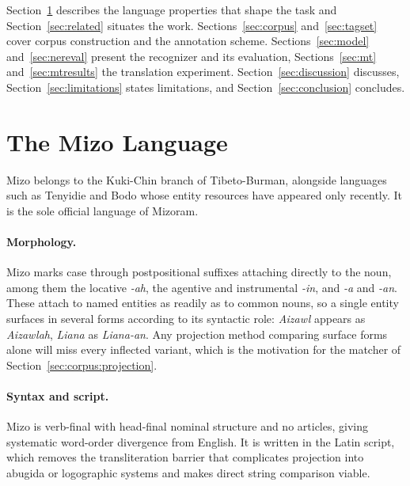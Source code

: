 \documentclass[acmsmall,screen,review]{acmart}
\begin{document}
Section~\ref{sec:mizo} describes the language properties that shape the task and
Section~\ref{sec:related} situates the work. Sections~\ref{sec:corpus}
and~\ref{sec:tagset} cover corpus construction and the annotation scheme.
Sections~\ref{sec:model} and~\ref{sec:nereval} present the recognizer and its
evaluation, Sections~\ref{sec:mt} and~\ref{sec:mtresults} the translation
experiment. Section~\ref{sec:discussion} discusses,
Section~\ref{sec:limitations} states limitations, and
Section~\ref{sec:conclusion} concludes.

\section{The Mizo Language}
\label{sec:mizo}

Mizo belongs to the Kuki-Chin branch of Tibeto-Burman, alongside languages such
as Tenyidie \citep{angami2025tenyidie} and Bodo \citep{narzary2024bodo} whose
entity resources have appeared only recently. It is the sole official language
of Mizoram.

\paragraph{Morphology.}
Mizo marks case through postpositional suffixes attaching directly to the noun,
among them the locative \textit{-ah}, the agentive and instrumental \textit{-in},
and \textit{-a} and \textit{-an}. These attach to named entities as readily as
to common nouns, so a single entity surfaces in several forms according to its
syntactic role: \textit{Aizawl} appears as \textit{Aizawlah}, \textit{Liana} as
\textit{Liana-an}. Any projection method comparing surface forms alone will miss
every inflected variant, which is the motivation for the matcher of
Section~\ref{sec:corpus:projection}.

\paragraph{Syntax and script.}
Mizo is verb-final with head-final nominal structure and no articles, giving
systematic word-order divergence from English. It is written in the Latin
script, which removes the transliteration barrier that complicates projection
into abugida or logographic systems and makes direct string comparison viable.
\end{document}
